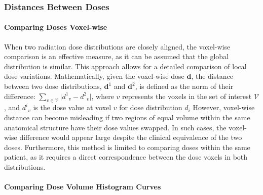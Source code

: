 \subsubsection{Distances Between Doses}
\paragraph{Comparing Doses Voxel-wise}
When two radiation dose distributions are closely aligned, the voxel-wise comparison is an effective measure, as it can be assumed that the global distribution is similar.
This approach allows for a detailed comparison of local dose variations.
Mathematically, given the voxel-wise dose $\textbf{d}$, the distance between two dose distributions, $\textbf{d}^1$ and $\textbf{d}^2$, is defined as the norm of their difference:
$\sum_{v \in \mathcal{V}} \lvert {d^1}_v - {d^2}_v \rvert$, where $v$ represents the voxels in the set of interest $\mathcal{V}$, and ${d^i}_v$ is the dose value at voxel $v$ for dose distribution $d_i$
However, voxel-wise distance can become misleading if two regions of equal volume within the same anatomical structure have their dose values swapped.
In such cases, the voxel-wise difference would appear large despite the clinical equivalence of the two doses.
Furthermore, this method is limited to comparing doses within the same patient, as it requires a direct correspondence between the dose voxels in both distributions.

\paragraph{Comparing Dose Volume Histogram Curves}

